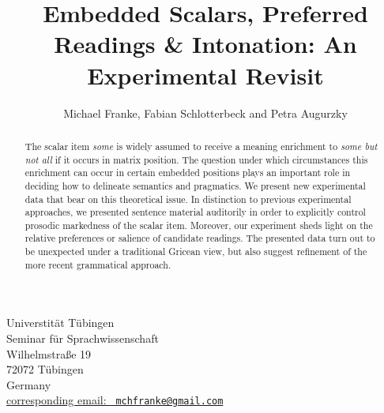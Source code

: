 \documentclass[fleqn,reqno,12pt]{article}
\title{Embedded Scalars, Preferred Readings \& Intonation: {A}n
  Experimental Revisit}
\author{Michael Franke, Fabian Schlotterbeck and Petra Augurzky
}
\date{}
\begin{document}
\maketitle

\thispagestyle{empty}

\vspace*{-1cm}
\begin{center}
  Universtit\"at T\"ubingen \\
  Seminar f\"ur Sprachwissenschaft \\
  Wilhelmstra\ss e 19\\
  72072 T\"ubingen\\
  Germany  \\
  \bigskip \href{mailto:mchfranke@gmail.com}{corresponding email: \tt
    mchfranke@gmail.com}
\end{center}

 \vspace*{1cm}



\begin{abstract}
  The scalar item \emph{some} is widely assumed to receive a meaning
  enrichment to \emph{some but not all} if it occurs in matrix
  position. The question under which circumstances this enrichment can
  occur in certain embedded positions plays an important role in
  deciding how to delineate semantics and pragmatics. %
  We present new experimental data that bear on this theoretical
  issue. In distinction to previous experimental approaches, we
  presented sentence material auditorily in order to explicitly
  control prosodic markedness of the scalar item. Moreover, our
  experiment sheds light on the relative preferences or salience of
  candidate readings. The presented data turn out to be unexpected
  under a traditional Gricean view, but also suggest refinement of the
  more recent grammatical approach.
\end{abstract}
\end{document}
